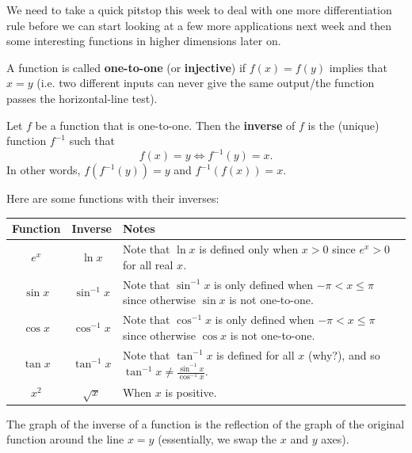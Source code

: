 


We need to take a quick pitstop this week to deal with one more differentiation rule before we can start looking at a few more applications
next week and then some interesting functions in higher dimensions later on.

\begin{defn}
  A function is called \textbf{one-to-one} (or \textbf{injective}) if $ f(x) = f(y) $ implies that $ x = y $ (i.e. two different inputs can never
  give the same output/the function passes the horizontal-line test).

  Let $ f $ be a function that is one-to-one. Then the \textbf{inverse} of $ f $ is the (unique) function $ f^{-1} $ such that
  \begin{displaymath}
    f(x) = y \iff f^{-1}(y) = x.
  \end{displaymath}
  In other words, $ f(f^{-1}(y)) = y $ and $ f^{-1}(f(x)) = x $.
\end{defn}

\begin{ex}
  Here are some functions with their inverses:
  \begin{center}
  \def\arraystretch{1.5}
  \begin{tabularx}{0.9\linewidth}{|c|c|X|}\hline
    \textbf{Function} & \textbf{Inverse} & \textbf{Notes}\\\hline
    $ e^x $ & $ \ln x $ & Note that $ \ln x $ is defined only when $ x > 0 $ since $ e^x > 0 $ for all real $ x $.\\
    $ \sin x $ & $ \sin^{-1} x $ & Note that $ \sin^{-1} x $ is only defined when $ -\pi < x \leq \pi $ since otherwise $ \sin x $ is not one-to-one.\\
    $ \cos x $ & $ \cos^{-1} x $ & Note that $ \cos^{-1} x $ is only defined when $ -\pi < x \leq \pi $ since otherwise $ \cos x $ is not one-to-one.\\
    $ \tan x $ & $ \tan^{-1} x $ & Note that $ \tan^{-1} x $ is defined for all $ x $ (why?), and so $ \tan^{-1} x \neq \frac{\sin^{-1} x}{\cos^{-1} x} $.\\
    $ x^2 $ & $ \sqrt{x} $ & When $ x $ is positive.\\\hline
  \end{tabularx}
  \end{center}
\end{ex}
The graph of the inverse of a function is the reflection of the graph of the original function around the line $ x = y $ (essentially, we swap
the $ x $ and $ y $ axes).

